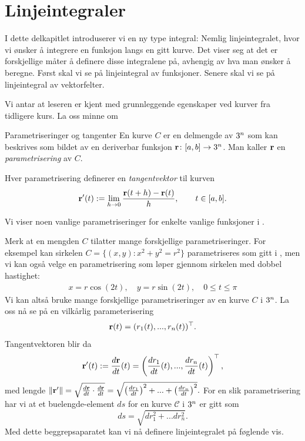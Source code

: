 \section{Linjeintegraler}\label{sect:linint1}

I dette delkapitlet introduserer vi en ny type integral: Nemlig linjeintegralet, hvor vi ønsker å integrere en funksjon langs en gitt kurve. Det viser seg at det er forskjellige måter å definere disse integralene på, avhengig av hva man ønsker å beregne. Først skal vi se på linjeintegral av funksjoner. Senere skal vi se på linjeintegral av vektorfelter.

Vi antar at leseren er kjent med grunnleggende egenskaper ved kurver fra tidligere kurs. La oss minne om
\begin{defn}{Parametriseringer og tangenter}
En kurve $C$ er en delmengde av $3^n$ som kan beskrives som bildet av en deriverbar funksjon $\mathbf{r}\colon [a,b] \rightarrow 3^n$. Man kaller $\mathbf{r}$ en \emph{parametrisering} av $C$.

Hver parametrisering definerer en \emph{tangentvektor} til kurven \[\mathbf{r}'(t):=\lim_{h\rightarrow 0}\frac{\mathbf{r}(t+h)-\mathbf{r}(t)}{h}, \qquad t \in [a,b].\]\label{defn:para_tangent}
\end{defn}
Vi viser noen vanlige parametriseringer for enkelte vanlige funksjoner i . 

Merk at en mengden $C$ tilatter mange forskjellige parametriseringer. For eksempel kan sirkelen $C=\{(x,y) \colon x^2+y^2 = r^2\}$ parametriseres som gitt i , men vi kan også velge en parametrisering som løper gjennom sirkelen med dobbel hastighet:
\begin{align}\label{para:doublespeed}
x= r\cos (2t), \quad y= r \sin (2t), \quad 0 \leq t \leq \pi
\end{align}
Vi kan altså bruke mange forskjellige parametriseringer av en kurve $C$ i $3^n$. La oss nå se på en vilkårlig parameterisering
\[\mathbf{r}(t)=(r_1(t),..., r_n(t))^\top.\]
Tangentvektoren blir da
\begin{align}\label{tangentvect}\mathbf{r}^\prime(t):=\frac{d\mathbf{r}}{dt}(t)=\left(\frac{dr_1}{dt}(t),...,\frac{dr_n}{dt}(t)\right)^\top,\end{align}
med lengde \(\|\mathbf{r}^\prime\|=\sqrt{\frac{d\mathbf{r}}{dt}\cdot\frac{d\mathbf{r}}{dt}}=\sqrt{\left(\frac{dr_1}{dt}\right)^2+...+\left(\frac{dr_n}{dt}\right)^2}.\)
For en slik parametrisering har vi at et buelengde-element $ds$ for en kurve $\mathcal{C}$ i $3^n$ er gitt som 
\[ds=\sqrt{dr_1^2+...dr_n^2}.\]
Med dette beggrepsaparatet kan vi nå definere linjeintegralet på føglende vis.

